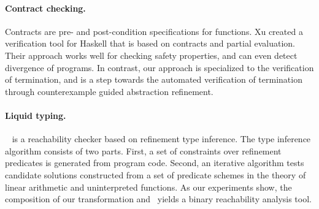 {\paragraph{Contract checking.}

Contracts are pre- and post-condition specifications for functions. Xu
created a verification tool \cite{DanaPhd} for Haskell that is based
on contracts and partial evaluation.  Their approach works well for
checking safety properties, and can even detect divergence of
programs. In contrast, our approach is specialized to the verification
of termination, and is a step towards the automated verification of
termination through counterexample guided abstraction refinement.

\paragraph{Liquid typing.}

\dsolve\ \cite{Dsolve} is a reachability checker based on refinement
type inference.  The type inference algorithm consists of two
parts. First, a set of constraints over refinement predicates is
generated from program code. Second, an iterative algorithm tests
candidate solutions constructed from a set of predicate schemes in the
theory of linear arithmetic and uninterpreted functions. As our
experiments show, the composition of our transformation and \dsolve\ 
yields a binary reachability analysis tool.

}

